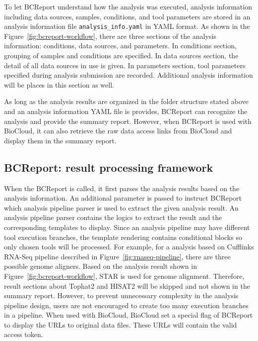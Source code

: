 To let BCReport understand how the analysis was executed, analysis information
including data sources, samples, conditions, and tool parameters are stored in
an analysis information file \texttt{analysis\_info.yaml} in YAML \cite{:yaml}
format. As shown in the Figure~\ref{fig:bcreport-workflow}, there are three
sections of the analysis information: conditions, data sources, and parameters.
In conditions section, grouping of samples and conditions are specified. In
data sources section, the detail of all data sources in use is given. In
parameters section, tool parameters specified during analysis submission are
recorded. Additional analysis information will be places in this section as
well.

As long as the analysis results are organized in the folder structure stated
above and an analysis information YAML file is provides, BCReport can recognize
the analysis and provide the summary report. However, when BCReport is used
with BioCloud, it can also retrieve the raw data access links from BioCloud and
display them in the summary report.


\subsection{BCReport: result processing framework}

When the BCReport is called, it first parses the analysis results based on the
analysis information. An additional parameter is passed to instruct BCReport
which analysis pipeline parser is used to extract the given analysis result. An
analysis pipeline parser contains the logics to extract the result and the
corresponding templates to display. Since an analysis pipeline may have
different tool execution branches, the template rendering contains conditional
blocks so only chosen tools will be processed. For example, for a analysis
based on Cufflinks RNA-Seq pipeline described in
Figure~\ref{fig:rnaseq-pipeline}, there are three possible genome aligners.
Based on the analysis result shown in Figure~\ref{fig:bcreport-workflow}, STAR
is used for genome alignment. Therefore, result sections about Tophat2 and
HISAT2 will be skipped and not shown in the summary report. However, to prevent
unnecessary complexity in the analysis pipeline design, users are not
encouraged to create too many execution branches in a pipeline. When used with
BioCloud, BioCloud set a special flag of BCReport to display the URLs to
original data files. These URLs will contain the valid access token.

